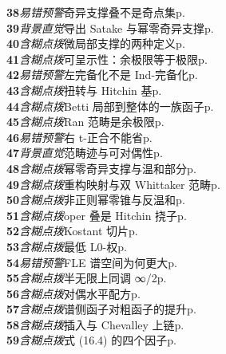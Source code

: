 \begin{multicols}{2}
\noindent\textbf{38}\;\textit{易错预警}\;奇异支撑叠不是奇点集\hfill p.\,\pageref{tn:38}\\[1pt]
\noindent\textbf{39}\;\textit{背景直觉}\;导出 Satake 与幂零奇异支撑\hfill p.\,\pageref{tn:39}\\[1pt]
\noindent\textbf{40}\;\textit{含糊点拨}\;微局部支撑的两种定义\hfill p.\,\pageref{tn:40}\\[1pt]
\noindent\textbf{41}\;\textit{含糊点拨}\;可呈示性：余极限等于极限\hfill p.\,\pageref{tn:41}\\[1pt]
\noindent\textbf{42}\;\textit{易错预警}\;左完备化不是 Ind-完备化\hfill p.\,\pageref{tn:42}\\[1pt]
\noindent\textbf{43}\;\textit{含糊点拨}\;扭转与 Hitchin 基\hfill p.\,\pageref{tn:43}\\[1pt]
\noindent\textbf{44}\;\textit{含糊点拨}\;Betti 局部到整体的一族函子\hfill p.\,\pageref{tn:44}\\[1pt]
\noindent\textbf{45}\;\textit{含糊点拨}\;Ran 范畴是余极限\hfill p.\,\pageref{tn:45}\\[1pt]
\noindent\textbf{46}\;\textit{易错预警}\;右 t-正合不能省\hfill p.\,\pageref{tn:46}\\[1pt]
\noindent\textbf{47}\;\textit{背景直觉}\;范畴迹与可对偶性\hfill p.\,\pageref{tn:47}\\[1pt]
\noindent\textbf{48}\;\textit{含糊点拨}\;幂零奇异支撑与温和部分\hfill p.\,\pageref{tn:48}\\[1pt]
\noindent\textbf{49}\;\textit{含糊点拨}\;重构映射与双 Whittaker 范畴\hfill p.\,\pageref{tn:49}\\[1pt]
\noindent\textbf{50}\;\textit{含糊点拨}\;非正则幂零锥与反温和\hfill p.\,\pageref{tn:50}\\[1pt]
\noindent\textbf{51}\;\textit{含糊点拨}\;oper 叠是 Hitchin 挠子\hfill p.\,\pageref{tn:51}\\[1pt]
\noindent\textbf{52}\;\textit{含糊点拨}\;Kostant 切片\hfill p.\,\pageref{tn:52}\\[1pt]
\noindent\textbf{53}\;\textit{含糊点拨}\;最低 L0-权\hfill p.\,\pageref{tn:53}\\[1pt]
\noindent\textbf{54}\;\textit{易错预警}\;FLE 谱空间为何更大\hfill p.\,\pageref{tn:54}\\[1pt]
\noindent\textbf{55}\;\textit{含糊点拨}\;半无限上同调 ∞/2\hfill p.\,\pageref{tn:55}\\[1pt]
\noindent\textbf{56}\;\textit{含糊点拨}\;对偶水平配方\hfill p.\,\pageref{tn:56}\\[1pt]
\noindent\textbf{57}\;\textit{含糊点拨}\;谱侧函子对粗函子的提升\hfill p.\,\pageref{tn:57}\\[1pt]
\noindent\textbf{58}\;\textit{含糊点拨}\;插入与 Chevalley 上链\hfill p.\,\pageref{tn:58}\\[1pt]
\noindent\textbf{59}\;\textit{含糊点拨}\;式 (16.4) 的四个因子\hfill p.\,\pageref{tn:59}\\[1pt]
\end{multicols}
